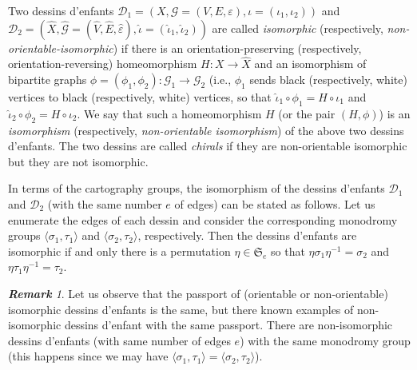 \documentclass[12pt]{amsart}
\theoremstyle{remark}
\newtheorem{rema}{\bf Remark}
\begin{document}
{\vspace{0.3cm}}

Two dessins d'enfants ${\mathcal D}_{1}=(X,{\mathcal G}=(V,E,\varepsilon),\iota=(\iota_{1},\iota_{2}))$ and 
${\mathcal D}_{2}=(\widehat{X},\widehat{\mathcal G}=(\widehat{V},\widehat{E},\widehat{\varepsilon}),\widehat{\iota}=(\widehat{\iota}_{1}, \widehat{\iota}_{2}))$ are called {\it isomorphic} (respectively, {\it non-orientable-isomorphic}) if there is an orientation-preserving (respectively, orientation-reversing) homeomorphism $H:X \to \widehat{X}$ and an isomorphism of bipartite graphs $\phi=(\phi_{1},\phi_{2}):{\mathcal G}_{1} \to {\mathcal G}_{2}$ (i.e., $\phi_{1}$ sends black (respectively, white) vertices to black (respectively, white) vertices, so that $\widehat{\iota}_{1} \circ \phi_{1} = H \circ \iota_{1}$ and $\widehat{\iota}_{2} \circ \phi_{2} = H \circ \iota_{2}$.
We say that such a homeomorphism $H$ (or the pair $(H,\phi)$) is an {\it isomorphism} (respectively, {\it non-orientable isomorphism}) of the above two dessins d'enfants. The two dessins are called {\it chirals} if they are non-orientable isomorphic but they are not isomorphic. 

{\vspace{0.3cm}}

In terms of the cartography groups, the isomorphism of the dessins d'enfants ${\mathcal D}_{1}$ and ${\mathcal D}_{2}$ (with the same number $e$ of edges) can be stated as follows. Let us enumerate the edges of each dessin and consider the corresponding monodromy groups $\langle \sigma_{1}, \tau_{1} \rangle$ and $\langle \sigma_{2}, \tau_{2} \rangle$, respectively. Then the dessins d'enfants are isomorphic if and only there is a permutation $\eta \in {\mathfrak S}_{e}$ so that $\eta \sigma_{1} \eta^{-1}=\sigma_{2}$ and $\eta \tau_{1} \eta^{-1}=\tau_{2}$. 

{\vspace{0.3cm}}
\noindent
\begin{rema}
Let us observe that the passport of (orientable or non-orientable) isomorphic dessins d'enfants is the same, but there known examples of non-isomorphic dessins d'enfant with the same passport. There are non-isomorphic dessins d'enfants (with same number of edges $e$) with the same monodromy group (this happens since we may have $\langle \sigma_{1},\tau_{1}\rangle=\langle \sigma_{2},\tau_{2}\rangle$). 
\end{rema}

{\vspace{0.3cm}}
\end{document}
